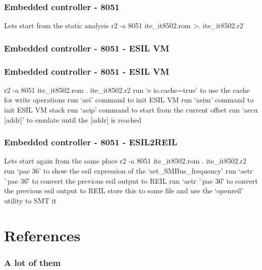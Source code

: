 \documentclass[10pt,pdf,utf8,english,compress,hyperref={unicode}]{beamer}
\begin{document}



\begin{frame}[fragile]
  \frametitle{Embedded controller - 8051}
  \center Lets start from the static analysis
  \center r2 -a 8051 ite\_it8502.rom
  \center \textgreater. ite\_it8502.r2
\end{frame}


\begin{frame}[fragile]
\ifxetex
  \frametitle{Embedded controller - 8051 - ESIL VM}
\else
  \frametitle{Embedded controller - 8051 - ESIL VM }
\fi
  \center r2 -a 8051 ite\_it8502.rom
  \center . ite\_it8502.r2
  \center run `e io.cache=true' to use the cache for write operations
  \center run `aei' command to init ESIL VM
  \center run `aeim' command to init ESIL VM stack
  \center run `aeip' command to start from the current offset
  \center run `aecu [addr]' to emulate until the [addr] is reached
\end{frame}

\begin{frame}[fragile]
  \frametitle{Embedded controller - 8051 - ESIL2REIL}
  \center Lets start again from the same place
  \center r2 -a 8051 ite\_it8502.rom
  \center . ite\_it8502.r2
  \center run `pae 36' to show the esil expression of the `set\_SMBus\_frequency'
\ifxetex
  \center run `aetr \`{}pae 36\`' to convert the previous esil output to REIL
\else
  \center run `aetr \`{}pae 36\`' to convert the previous esil output to REIL
\fi
  \center store this to some file and use the `openreil' utility to SMT it
\end{frame}

\ifxetex
\else
\section{References}
\begin{frame}[allowframebreaks]
	\frametitle{A lot of them}
	\printbibliography
\end{frame}
\fi
\end{document}
